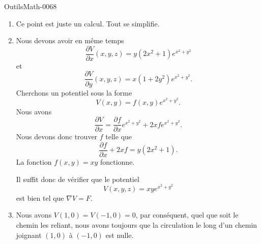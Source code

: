 
\begin{corrige}{OutilsMath-0068}

    \begin{enumerate}
        \item
            Ce point est juste un calcul. Tout se simplifie.
        \item
            Nous devons avoir en même temps
            \begin{equation}
                \frac{ \partial V }{ \partial x }(x,y,z)=y(2x^2+1) e^{x^2+y^2}
            \end{equation}
            et
            \begin{equation}
                \frac{ \partial V }{ \partial y }(x,y,z)=x(1+2y^2) e^{x^2+y^2}.
            \end{equation}
            Cherchons un potentiel sous la forme
            \begin{equation}
                V(x,y)=f(x,y) e^{x^2+y^2}.
            \end{equation}
            Nous avons
            \begin{equation}
                \frac{ \partial V }{ \partial x }=\frac{ \partial f }{ \partial x } e^{x^2+y^2}+2x f e^{x^2+y^2}.
            \end{equation}
            Nous devons donc trouver $f$ telle que
            \begin{equation}
                \frac{ \partial f }{ \partial x }+2xf=y(2x^2+1).
            \end{equation}
            La fonction $f(x,y)=xy$ fonctionne.

            Il suffit donc de vérifier que le potentiel
            \begin{equation}
                V(x,y,z)=xy e^{x^2+y^2}
            \end{equation}
            est bien tel que $\nabla V=F$.

        \item
            Nous avons $V(1,0)=V(-1,0)=0$, par conséquent, quel que soit le chemin les reliant, nous avons toujours que la circulation le long d'un chemin joignant $(1,0)$ à $(-1,0)$ est nulle.
    \end{enumerate}

\end{corrige}
